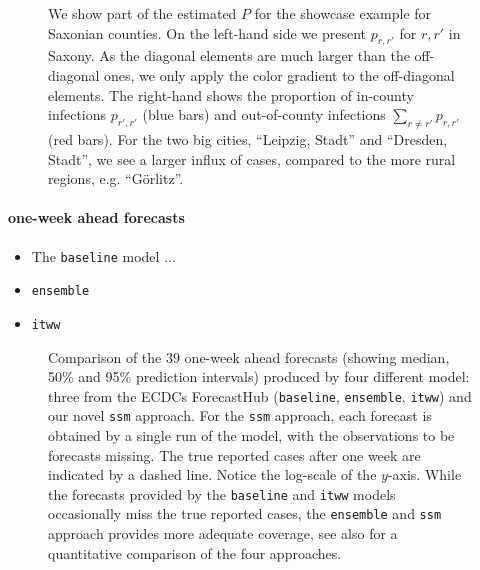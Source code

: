 \begin{figure}
    \resizebox{\textwidth}{!}{%
    }
    \caption{We show part of the estimated $P$ for the showcase example for Saxonian counties. On the left-hand side we present $p_{r,r'}$ for $r,r'$ in Saxony. As the diagonal elements are much larger than the off-diagonal ones, we only apply the color gradient to the off-diagonal elements. The right-hand shows the proportion of in-county infections $p_{r',r'}$ (blue bars) and out-of-county infections $\sum_{r \neq r'} p_{r,r'}$ (red bars). For the two big cities, ``Leipzig, Stadt'' and ``Dresden, Stadt'', we see a larger influx of cases, compared to the more rural regions, e.g. ``Görlitz''.} 
    \label{fig:P_matrix_saxony.tex}
\end{figure}


\paragraph{one-week ahead forecasts}

% 

\begin{itemize}
    \item The \texttt{baseline} model ...
    \item \texttt{ensemble} 
    \item \texttt{itww}
\end{itemize}

\begin{figure}
    \resizebox{\textwidth}{!}{%
    }
    \caption{Comparison of the $39$ one-week ahead forecasts (showing median, 50\% and 95\% prediction intervals) produced by four different model: three from the ECDCs ForecastHub (\texttt{baseline}, \texttt{ensemble}, \texttt{itww}) and our novel \texttt{ssm} approach. For the \texttt{ssm} approach, each forecast is obtained by a single run of the model, with the observations to be forecasts missing. The true reported cases after one week are indicated by a dashed line. Notice the log-scale of the $y$-axis. While the forecasts provided by the \texttt{baseline} and \texttt{itww} models occasionally miss the true reported cases, the \texttt{ensemble} and \texttt{ssm} approach provides more adequate coverage, see also  for a quantitative comparison of the four approaches.}

    \label{fig:regional_forecasts_comparison.tex}
\end{figure}


